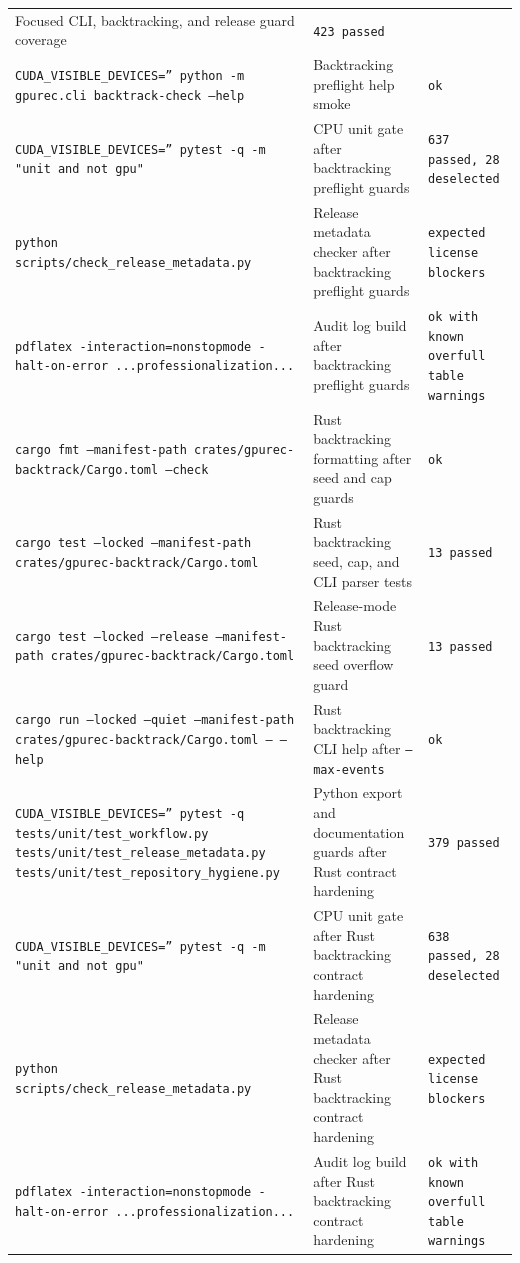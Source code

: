 \documentclass[11pt]{article}
\begin{document}
\begin{center}
\begin{tabular}{lll}
Focused CLI, backtracking, and release guard coverage &
\texttt{423 passed} \\
\texttt{CUDA\_VISIBLE\_DEVICES='' python -m gpurec.cli backtrack-check --help} &
Backtracking preflight help smoke &
\texttt{ok} \\
\texttt{CUDA\_VISIBLE\_DEVICES='' pytest -q -m "unit and not gpu"} &
CPU unit gate after backtracking preflight guards &
\texttt{637 passed, 28 deselected} \\
\texttt{python scripts/check\_release\_metadata.py} &
Release metadata checker after backtracking preflight guards &
\texttt{expected license blockers} \\
\texttt{pdflatex -interaction=nonstopmode -halt-on-error ...professionalization...} &
Audit log build after backtracking preflight guards &
\texttt{ok with known overfull table warnings} \\
\texttt{cargo fmt --manifest-path crates/gpurec-backtrack/Cargo.toml --check} &
Rust backtracking formatting after seed and cap guards &
\texttt{ok} \\
\texttt{cargo test --locked --manifest-path crates/gpurec-backtrack/Cargo.toml} &
Rust backtracking seed, cap, and CLI parser tests &
\texttt{13 passed} \\
\texttt{cargo test --locked --release --manifest-path crates/gpurec-backtrack/Cargo.toml} &
Release-mode Rust backtracking seed overflow guard &
\texttt{13 passed} \\
\texttt{cargo run --locked --quiet --manifest-path crates/gpurec-backtrack/Cargo.toml -- --help} &
Rust backtracking CLI help after \texttt{--max-events} &
\texttt{ok} \\
\texttt{CUDA\_VISIBLE\_DEVICES='' pytest -q tests/unit/test\_workflow.py tests/unit/test\_release\_metadata.py tests/unit/test\_repository\_hygiene.py} &
Python export and documentation guards after Rust contract hardening &
\texttt{379 passed} \\
\texttt{CUDA\_VISIBLE\_DEVICES='' pytest -q -m "unit and not gpu"} &
CPU unit gate after Rust backtracking contract hardening &
\texttt{638 passed, 28 deselected} \\
\texttt{python scripts/check\_release\_metadata.py} &
Release metadata checker after Rust backtracking contract hardening &
\texttt{expected license blockers} \\
\texttt{pdflatex -interaction=nonstopmode -halt-on-error ...professionalization...} &
Audit log build after Rust backtracking contract hardening &
\texttt{ok with known overfull table warnings} \\

\end{tabular}
\end{center}
\end{document}
